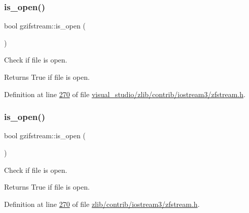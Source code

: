\subsubsection{\texorpdfstring{is\+\_\+open()}{is\_open()}\hspace{0.1cm}{\footnotesize\ttfamily [1/2]}}
{\footnotesize\ttfamily bool gzifstream\+::is\+\_\+open (\begin{DoxyParamCaption}{ }\end{DoxyParamCaption})\hspace{0.3cm}{\ttfamily [inline]}}



Check if file is open. 

\begin{DoxyReturn}{Returns}
True if file is open. 
\end{DoxyReturn}


Definition at line \hyperlink{visual__studio_2zlib_2contrib_2iostream3_2zfstream_8h_source_l00270}{270} of file \hyperlink{visual__studio_2zlib_2contrib_2iostream3_2zfstream_8h_source}{visual\+\_\+studio/zlib/contrib/iostream3/zfstream.\+h}.

\mbox{\label{classgzifstream_a8e9de13b311b698ef0ccc276b71c7941}} 
\subsubsection{\texorpdfstring{is\+\_\+open()}{is\_open()}\hspace{0.1cm}{\footnotesize\ttfamily [2/2]}}
{\footnotesize\ttfamily bool gzifstream\+::is\+\_\+open (\begin{DoxyParamCaption}{ }\end{DoxyParamCaption})\hspace{0.3cm}{\ttfamily [inline]}}



Check if file is open. 

\begin{DoxyReturn}{Returns}
True if file is open. 
\end{DoxyReturn}


Definition at line \hyperlink{zlib_2contrib_2iostream3_2zfstream_8h_source_l00270}{270} of file \hyperlink{zlib_2contrib_2iostream3_2zfstream_8h_source}{zlib/contrib/iostream3/zfstream.\+h}.

\mbox{\label{classgzifstream_a8105f9300d36dafbe8b10c204583f5a1}} 
